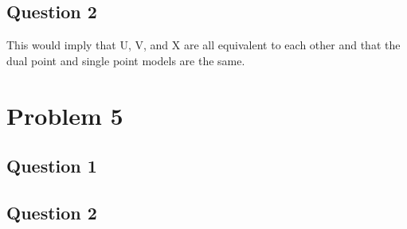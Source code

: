 \documentclass[12pt]{article} %
\begin{document}
\subsection{Question 2}
This would imply that U, V, and X are all equivalent to each other and that the dual point and single point models are the same. 

\section{Problem 5}

\subsection{Question 1}
\begin{figure}[H]
	\vspace{-10mm}
\end{figure}

\subsection{Question 2}
\begin{figure}[H]
	\vspace{-10mm}
\end{figure}
\end{document}
